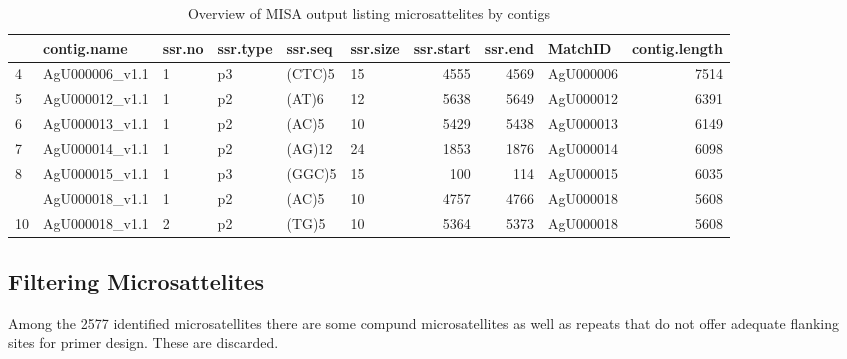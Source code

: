 \documentclass[]{article}
\begin{document}
\begin{longtable}[t]{llllllrrlr}
\caption{\label{tab:unnamed-chunk-4}Overview of MISA output listing microsattelites by contigs}\\
\toprule
  & contig.name & ssr.no & ssr.type & ssr.seq & ssr.size & ssr.start & ssr.end & MatchID & contig.length\\
\midrule
4 & AgU000006\_v1.1 & 1 & p3 & (CTC)5 & 15 & 4555 & 4569 & AgU000006 & 7514\\
5 & AgU000012\_v1.1 & 1 & p2 & (AT)6 & 12 & 5638 & 5649 & AgU000012 & 6391\\
6 & AgU000013\_v1.1 & 1 & p2 & (AC)5 & 10 & 5429 & 5438 & AgU000013 & 6149\\
7 & AgU000014\_v1.1 & 1 & p2 & (AG)12 & 24 & 1853 & 1876 & AgU000014 & 6098\\
8 & AgU000015\_v1.1 & 1 & p3 & (GGC)5 & 15 & 100 & 114 & AgU000015 & 6035\\
\addlinespace
9 & AgU000018\_v1.1 & 1 & p2 & (AC)5 & 10 & 4757 & 4766 & AgU000018 & 5608\\
10 & AgU000018\_v1.1 & 2 & p2 & (TG)5 & 10 & 5364 & 5373 & AgU000018 & 5608\\
\bottomrule
\end{longtable}

\newpage

\subsection{Filtering Microsattelites}\label{filtering-microsattelites}

Among the 2577 identified microsatellites there are some compund
microsatellites as well as repeats that do not offer adequate flanking
sites for primer design. These are discarded.
\end{document}

